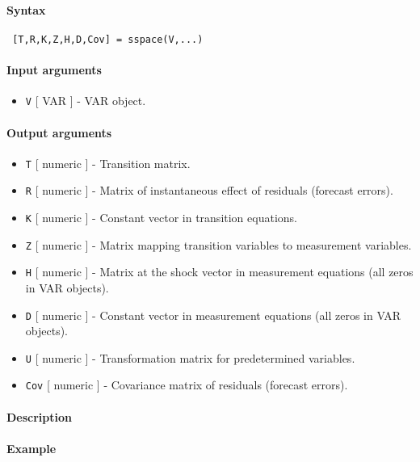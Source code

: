 


	\paragraph{Syntax}
 
 \begin{verbatim}
 [T,R,K,Z,H,D,Cov] = sspace(V,...)
 \end{verbatim}
 
 \paragraph{Input arguments}
 
 \begin{itemize}
 \item
   \texttt{V} {[} VAR {]} - VAR object.
 \end{itemize}
 
 \paragraph{Output arguments}
 
 \begin{itemize}
 \item
   \texttt{T} {[} numeric {]} - Transition matrix.
 \item
   \texttt{R} {[} numeric {]} - Matrix of instantaneous effect of
   residuals (forecast errors).
 \item
   \texttt{K} {[} numeric {]} - Constant vector in transition equations.
 \item
   \texttt{Z} {[} numeric {]} - Matrix mapping transition variables to
   measurement variables.
 \item
   \texttt{H} {[} numeric {]} - Matrix at the shock vector in measurement
   equations (all zeros in VAR objects).
 \item
   \texttt{D} {[} numeric {]} - Constant vector in measurement equations
   (all zeros in VAR objects).
 \item
   \texttt{U} {[} numeric {]} - Transformation matrix for predetermined
   variables.
 \item
   \texttt{Cov} {[} numeric {]} - Covariance matrix of residuals
   (forecast errors).
 \end{itemize}
 
 \paragraph{Description}
 
 \paragraph{Example}


